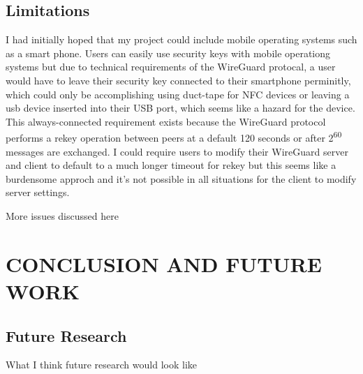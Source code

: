 \documentclass [11pt, proquest] {uwthesis}[2020/02/24]
\begin{document}
\section {Limitations}
I had initially hoped that my project could include mobile operating systems such as a smart phone. Users can easily use security keys
with mobile operationg systems but due to technical requirements of the WireGuard protocal, a user would have to leave their security key connected
to their smartphone perminitly, which could only be accomplishing using duct-tape for NFC devices or leaving a usb device inserted into their USB port, which 
seems like a hazard for the device. This always-connected requirement exists because the WireGuard protocol performs a rekey operation between peers at a default 120 seconds 
or after 2\textsuperscript{60} messages are exchanged. I could require users to modify their WireGuard server and client to default to a much longer 
timeout for rekey but this seems like a burdensome approch and it's not possible in all situations for the client to modify server settings.

More issues discussed here 


\chapter {CONCLUSION AND FUTURE WORK}


\section {Future Research}
What I think future research would look like
\end{document}
